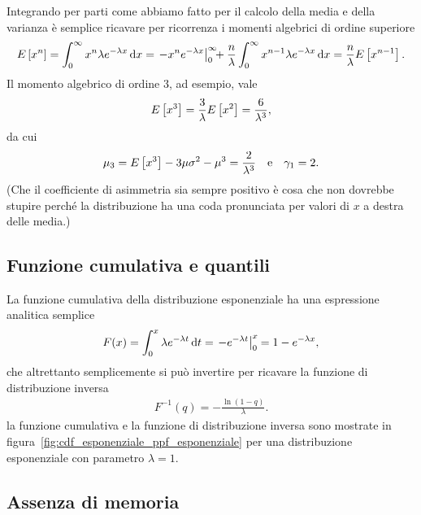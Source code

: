 Integrando per parti come abbiamo fatto per il calcolo della media e della
varianza è semplice ricavare per ricorrenza i momenti algebrici di
ordine superiore
\begin{align*}
  \expect{x^n} = \int_0^\infty x^n \lambda e^{-\lambda x}\diff =
  \eval{- x^n e^{-\lambda x}}{0}{\infty} \:\: +
  \frac{n}{\lambda} \int_0^\infty x^{n-1} \lambda e^{-\lambda x}\diff =
  \frac{n}{\lambda}\expect{x^{n-1}}.
\end{align*}
Il momento algebrico di ordine $3$, ad esempio, vale
\begin{align*}
  \displaystyle E\left[x^3\right] = \frac{3}{\lambda}\displaystyle E\left[x^2\right] = \frac{6}{\lambda^3},
\end{align*}
da cui
\begin{align}
  \displaystyle \mu_{3} = \displaystyle E\left[x^3\right] - 3\mu\sigma^2 - \mu^3 = \frac{2}{\lambda^3}
  \quad \text{e} \quad
  \displaystyle \gamma_1 = 2.
\end{align}
(Che il coefficiente di asimmetria sia sempre positivo è cosa che non dovrebbe
stupire perché la distribuzione ha una coda pronunciata per valori di $x$
a destra delle media.)


\subsection{Funzione cumulativa e quantili}

La funzione cumulativa della distribuzione esponenziale ha una espressione
analitica semplice
\begin{align}
  F(x) = \int_0^{x} \lambda e^{-\lambda t} \diff[t] =
  \eval{-e^{-\lambda t}}{0}{x} \:\: =
  1 - e^{-\lambda x},
\end{align}
che altrettanto semplicemente si può invertire per ricavare la funzione di
distribuzione inversa
\begin{align}
  F^{-1}(q) = -\frac{\ln(1 - q)}{\lambda}.
\end{align}
la funzione cumulativa e la funzione di distribuzione inversa sono mostrate
in figura~\ref{fig:cdf_esponenziale_ppf_esponenziale} per una distribuzione
esponenziale con parametro $\lambda = 1$.



\subsection{Assenza di memoria}

